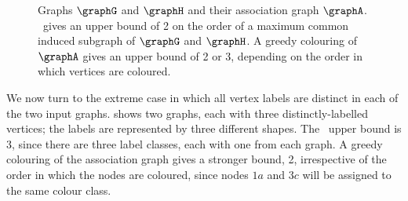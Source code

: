 \begin{figure}[htb]
\centering
{}
\qquad\quad
{}
\qquad\quad
{}
\qquad

\caption{Graphs $\graphG$ and $\graphH$ and their association graph $\graphA$.  \McSplit\
    gives an upper bound of 2 on the order of a maximum common induced subgraph
    of $\graphG$ and $\graphH$.  A greedy colouring of $\graphA$
    gives an upper bound of 2 or
    3, depending on the order in which vertices are coloured.}
\label{fig:mcsplit-better-bound}
\end{figure}

We now turn to the extreme case in which all vertex labels are distinct
in each of the two input graphs.  \Cref{fig:clique-bound-labelled} shows
two graphs, each with three distinctly-labelled vertices; the labels
are represented by three different shapes.  The \McSplit\ upper bound is 3,
since there are three label classes, each with one from each graph.
A greedy colouring of the association graph gives a stronger bound, 2,
irrespective of the order in which the nodes are coloured, since
nodes $1a$ and $3c$ will be assigned to the same colour class.


